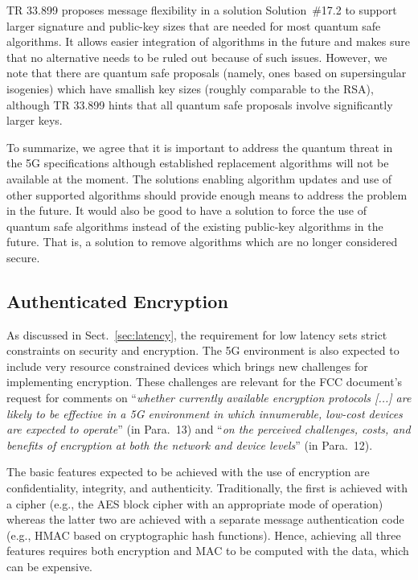 \documentclass[12pt]{llncs}
\newcommand\ques[1]{``\emph{#1}''}
\begin{document}
TR 33.899 proposes message flexibility in a solution Solution~\#17.2 to support larger signature and public-key sizes that are needed for most quantum safe algorithms. It allows easier integration of algorithms in the future and makes sure that no alternative needs to be ruled out because of such issues. However, we note that there are quantum safe proposals (namely, ones based on supersingular isogenies) which have smallish key sizes (roughly comparable to the RSA), although TR 33.899 hints that all quantum safe proposals involve significantly larger keys.

To summarize, we agree that it is important to address the quantum threat in the 5G specifications although established replacement algorithms will not be available at the moment. The solutions enabling algorithm updates and use of other supported algorithms should provide enough means to address the problem in the future. It would also be good to have a solution to force the use of quantum safe algorithms instead of the existing public-key algorithms in the future. That is, a solution to remove algorithms which are no longer considered secure.


\subsection{Authenticated Encryption}
\label{sec:ae}

As discussed in Sect.~\ref{sec:latency}, the requirement for low latency sets strict constraints on security and encryption. The 5G environment is also expected to include very resource constrained devices which brings new challenges for implementing encryption. These challenges are relevant for the FCC document's request for comments on \ques{whether currently available encryption protocols [...] are likely to be effective in a 5G environment in which innumerable, low-cost devices are expected to operate}  (in Para.~13) and \ques{on the perceived challenges, costs, and benefits of encryption at both the network and device levels} (in Para.~12). 

The basic features expected to be achieved with the use of encryption are confidentiality, integrity, and authenticity. Traditionally, the first is achieved with a cipher (e.g., the AES block cipher with an appropriate mode of operation) whereas the latter two are achieved with a separate message authentication code (e.g., HMAC based on cryptographic hash functions). Hence, achieving all three features requires both encryption and MAC to be computed with the data, which can be expensive. 
\end{document}
